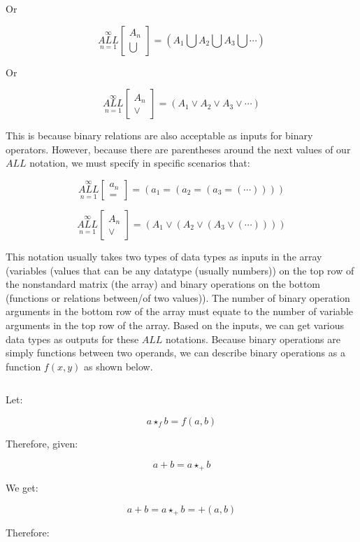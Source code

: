 \documentclass{article}
\begin{document}
Or

$$\underset{n=1}{\overset{\infty}{ALL}} \begin{bmatrix}
A_n \\
\bigcup
\end{bmatrix} = (A_1 \bigcup A_2 \bigcup A_3 \bigcup \cdots)$$

Or

$$\underset{n=1}{\overset{\infty}{ALL}} \begin{bmatrix}
A_n \\
\vee
\end{bmatrix} = (A_1 \vee A_2 \vee A_3 \vee \cdots)$$

This is because binary relations are also acceptable as inputs for binary operators. However, because there are parentheses around the next values of our $ALL$ notation, we must specify in specific scenarios that:

$$\underset{n=1}{\overset{\infty}{ALL}} \begin{bmatrix}
a_n \\
=
\end{bmatrix} = (a_1=(a_2=(a_3=(\cdots))))$$

$$\underset{n=1}{\overset{\infty}{ALL}} \begin{bmatrix}
A_n \\
\vee
\end{bmatrix} = (A_1 \vee (A_2 \vee (A_3 \vee (\cdots))))$$


This notation usually takes two types of data types as inputs in the array (variables (values that can be any datatype (usually numbers)) on the top row of the nonstandard matrix (the array) and binary operations on the bottom (functions or relations between/of two values)). The number of binary operation arguments in the bottom row of the array must equate to the number of variable arguments in the top row of the array. Based on the inputs, we can get various data types as outputs for these $ALL$ notations. Because binary operations are simply functions between two operands, we can describe binary operations as a function $f(x,y)$ as shown below.

$${}$$

Let:

$$a \star_f b = f(a,b)$$

Therefore, given:

$$a+b= a \star_+ b$$

We get:

$$a+b= a \star_+ b = +(a,b)$$

Therefore:
\end{document}
